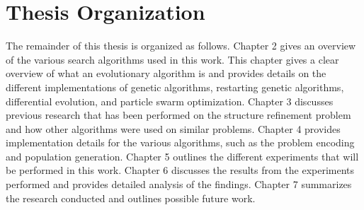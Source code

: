 \section{Thesis Organization}

The remainder of this thesis is organized as follows. Chapter 2 gives an overview of the various search algorithms used in this work. This chapter gives a clear overview of what an evolutionary algorithm is and provides details on the different implementations of genetic algorithms, restarting genetic algorithms, differential evolution, and particle swarm optimization. Chapter 3 discusses previous research that has been performed on the structure refinement problem and how other algorithms were used on similar problems. Chapter 4 provides implementation details for the various algorithms, such as the problem encoding and population generation. Chapter 5 outlines the different experiments that will be performed in this work. Chapter 6 discusses the results from the experiments performed and provides detailed analysis of the findings. Chapter 7 summarizes the research conducted and outlines possible future work.